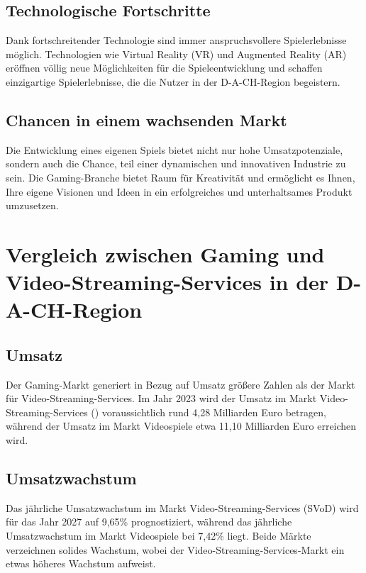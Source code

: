 \subsection{Technologische Fortschritte}
Dank fortschreitender Technologie sind immer anspruchsvollere Spielerlebnisse möglich. Technologien wie Virtual Reality (VR) und Augmented Reality (AR) eröffnen völlig neue Möglichkeiten für die Spieleentwicklung und schaffen einzigartige Spielerlebnisse, die die Nutzer in der D-A-CH-Region begeistern.

\subsection{Chancen in einem wachsenden Markt}
Die Entwicklung eines eigenen Spiels bietet nicht nur hohe Umsatzpotenziale, sondern auch die Chance, teil einer dynamischen und innovativen Industrie zu sein. Die Gaming-Branche bietet Raum für Kreativität und ermöglicht es Ihnen, Ihre eigene Visionen und Ideen in ein erfolgreiches und unterhaltsames Produkt umzusetzen.

\pagebreak

\section{Vergleich zwischen Gaming und Video-Streaming-Services in der D-A-CH-Region}

\subsection{Umsatz}

Der Gaming-Markt generiert in Bezug auf Umsatz größere Zahlen als der Markt für Video-Streaming-Services. Im Jahr 2023 wird der Umsatz im Markt Video-Streaming-Services () voraussichtlich rund 4,28 Milliarden Euro betragen, während der Umsatz im Markt Videospiele etwa 11,10 Milliarden Euro erreichen wird.

\subsection{Umsatzwachstum}

Das jährliche Umsatzwachstum im Markt Video-Streaming-Services (SVoD) wird für das Jahr 2027 auf 9,65\%  prognostiziert, während das jährliche Umsatzwachstum im Markt Videospiele bei 7,42\% liegt. Beide Märkte verzeichnen solides Wachstum, wobei der Video-Streaming-Services-Markt ein etwas höheres Wachstum aufweist.

